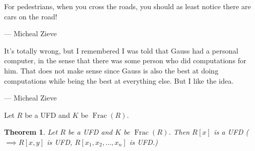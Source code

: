 \documentclass{article}
\def \Fr {\operatorname{Frac}}
\newtheorem*{theorem}{Theorem}
\theoremstyle{definition}
\theoremstyle{remark}
\begin{document}

\epigraph{For pedestrians, when you cross the roads, you should as least notice there are cars on the road!}{--- \textup{Micheal Zieve}}
\epigraph{It's totally wrong, but I remembered I was told that Gauss had a personal computer, in the sense that there was some person who did computations for him. That does not make sense since Gauss is also the best at doing computations while being the best at everything else. But I like the idea.}{--- \textup{Micheal Zieve}}
\bigskip

Let $R$ be a UFD and $K$ be $\Fr(R)$.
\begin{theorem}
    Let $R$ be a UFD and $K$ be $\Fr(R)$. Then $R[x]$ is a UFD ($\implies R[x, y]$ is UFD, $R[x_1, x_2, \ldots, x_n]$ is UFD.)
\end{theorem}
\end{document}
